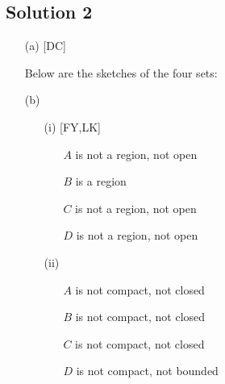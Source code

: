 \subsection*{Solution 2}

\begin{itemize}
\item[(a)][DC]

Below are the sketches of the four sets:



\item[(b)]
\begin{itemize}
\item[(i)][FY,LK]

\begin{itemize}
\item[$A$] is not a region, not open
\item[$B$] is a region
\item[$C$] is not a region, not open
\item[$D$] is not a region, not open
\end{itemize}

\item[(ii)]

\begin{itemize}
\item[$A$] is not compact, not closed
\item[$B$] is not compact, not closed
\item[$C$] is not compact, not closed
\item[$D$] is not compact, not bounded
\end{itemize}

\end{itemize}

\end{itemize}

